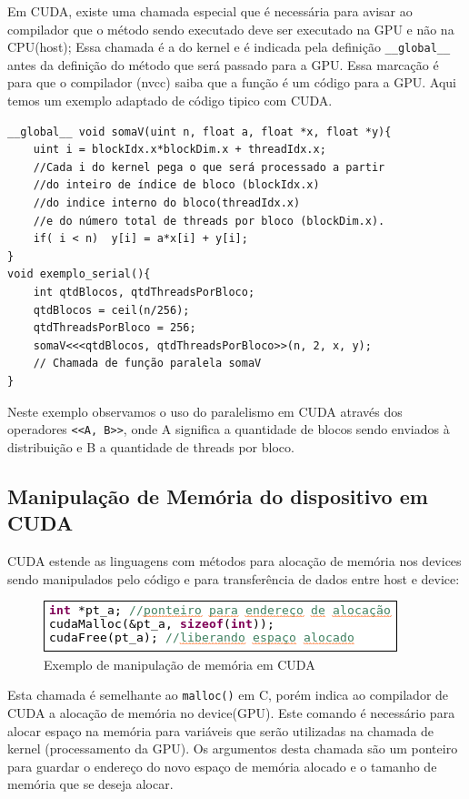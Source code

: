 \documentclass[12pt]{article}
\begin{document}
Em CUDA, existe uma chamada especial que é necessária para avisar ao compilador que o método sendo executado deve ser executado na GPU e não na CPU(host); Essa chamada é a do kernel e é indicada pela definição \verb|__global__| antes da definição do método que será passado para a GPU. Essa marcação é para que o compilador (nvcc) saiba que a função é um código para a GPU. Aqui temos um exemplo adaptado de código tipico com CUDA.
\begin{verbatim}
__global__ void somaV(uint n, float a, float *x, float *y){
    uint i = blockIdx.x*blockDim.x + threadIdx.x;
    //Cada i do kernel pega o que será processado a partir
    //do inteiro de índice de bloco (blockIdx.x)
    //do indice interno do bloco(threadIdx.x)
    //e do número total de threads por bloco (blockDim.x).
    if( i < n)  y[i] = a*x[i] + y[i];
}
void exemplo_serial(){
    int qtdBlocos, qtdThreadsPorBloco;
    qtdBlocos = ceil(n/256);
    qtdThreadsPorBloco = 256;
    somaV<<<qtdBlocos, qtdThreadsPorBloco>>(n, 2, x, y);
    // Chamada de função paralela somaV
}
\end{verbatim}
Neste exemplo observamos o uso do paralelismo em CUDA através dos operadores \verb|<<A, B>>|, onde A significa a quantidade de blocos sendo enviados à distribuição e B a quantidade de threads por bloco.

\subsection{Manipulação de Memória do dispositivo em CUDA}

CUDA estende as linguagens com métodos para alocação de memória nos devices sendo manipulados pelo código e para transferência de dados entre host e device:
\begin{figure}[H]
\centering
\includegraphics[width=.5\textwidth]{cudamallocCUDA.png}
\caption{Exemplo de manipulação de memória em CUDA}
\label{fig:figura6}
\end{figure}
Esta chamada é semelhante ao \verb|malloc()| em C, porém indica ao compilador de CUDA a alocação de memória no device(GPU). Este comando é necessário para alocar espaço na memória para variáveis que serão utilizadas na chamada de kernel (processamento da GPU). Os argumentos desta chamada são um ponteiro para guardar o endereço do novo espaço de memória alocado e o tamanho de memória que se deseja alocar.
\end{document}
